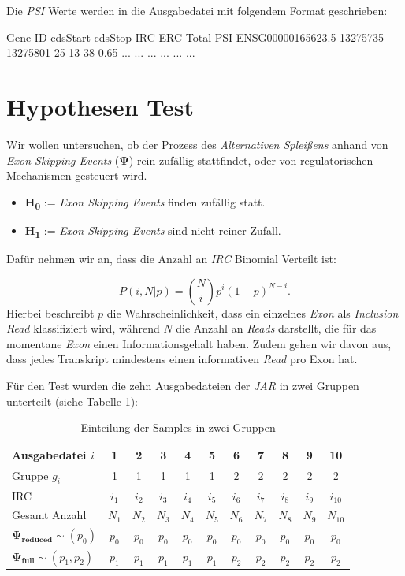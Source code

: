 \documentclass[12pt]{article}
\begin{document}
Die \textit{PSI} Werte werden in die Ausgabedatei mit folgendem Format geschrieben:
\begin{verbatim*}
   Gene ID            cdsStart-cdsStop   IRC   ERC  Total  PSI
   ENSG00000165623.5  13275735-13275801  25    13   38     0.65
   ...                ...                ...   ...  ...    ...
\end{verbatim*}

\section{Hypothesen Test}
Wir wollen untersuchen, ob der Prozess des \textit{Alternativen Splei\ss ens} anhand von 
\textit{Exon Skipping Events} ($\mathbf{\Psi}$) rein zufällig stattfindet, oder von regulatorischen 
Mechanismen gesteuert wird. 

\begin{itemize}
    \item \textbf{H\textsubscript{0}} := \textit{Exon Skipping Events} finden zufällig statt.
    \item \textbf{H\textsubscript{1}} := \textit{Exon Skipping Events} sind nicht reiner Zufall.
\end{itemize}
Dafür nehmen wir an, dass die Anzahl an \textit{IRC} Binomial Verteilt ist:

\[
P(i,N|p) = \binom{N}{i}p^{i}(1-p)^{N-i}
.\]
Hierbei beschreibt $p$ die Wahrscheinlichkeit, dass ein einzelnes \textit{Exon} als \textit{Inclusion Read} klassifiziert wird,
während $N$ die Anzahl an \textit{Reads} darstellt, die für das momentane \textit{Exon} einen Informationsgehalt haben.
Zudem gehen wir davon aus, dass jedes Transkript mindestens einen informativen \textit{Read} pro Exon hat.

Für den Test wurden die zehn Ausgabedateien der \textit{JAR} in zwei Gruppen unterteilt (siehe Tabelle \ref{tab:einteilung}):

\begin{table}[htpb]
    \centering
    \caption{Einteilung der Samples in zwei Gruppen}
    \label{tab:einteilung}
\begin{tabular}{|l||c|c|c|c|c|c|c|c|c|c|} \hline
     Ausgabedatei $i$   & 1 & 2 & 3 & 4 & 5 & 6 & 7 & 8 & 9 & 10 \\\hline
     Gruppe $g_{i}$ & 1 & 1 & 1 & 1 & 1 & 2 & 2 & 2 & 2 & 2 \\\hline
     IRC          &$i_{1}$&$i_{2}$&$i_{3}$&$i_{4}$&$i_{5}$&$i_{6}$&$i_{7}$&$i_{8}$&$i_{9}$&$i_{10}$  \\\hline
     Gesamt Anzahl&$N_{1}$&$N_{2}$&$N_{3}$&$N_{4}$&$N_{5}$&$N_{6}$&$N_{7}$&$N_{8}$&$N_{9}$&$N_{10}$  \\ \hline\hline
     $\mathbf{\Psi_{reduced}} \sim (p_{0})$   &$p_{0}$&$p_{0}$&$p_{0}$&$p_{0}$&$p_{0}$&$p_{0}$&$p_{0}$&$p_{0}$&$p_{0}$&$p_{0}$\\\hline
     $\mathbf{\Psi_{full}} \sim  (p_{1}, p_{2})$ &$p_{1}$&$p_{1}$&$p_{1}$&$p_{1}$&$p_{1}$&$p_{2}$&$p_{2}$&$p_{2}$&$p_{2}$&$p_{2}$\\\hline
\end{tabular}
\end{table}
\newpage
\end{document}
